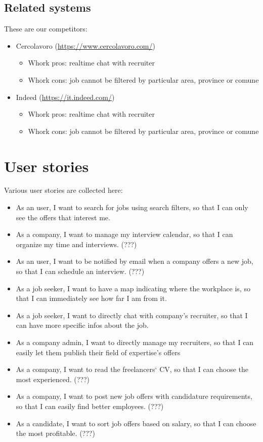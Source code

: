\documentclass[12pt, a4paper]{article}
\begin{document}
\subsection{Related systems}
These are our competitors:
\begin{itemize}
	\item Cercolavoro (\url{https://www.cercolavoro.com/})
	\begin{itemize}
		\item Whork pros: realtime chat with recruiter
		\item Whork cons: job cannot be filtered by particular area, province or comune
	\end{itemize}
	\item Indeed (\url{https://it.indeed.com/})
	\begin{itemize}
		\item Whork pros: realtime chat with recruiter
		\item Whork cons: job cannot be filtered by particular area, province or comune
	\end{itemize}
\end{itemize}

\section{User stories}
Various user stories are collected here:
\begin{itemize}
	\item As an user, I want to search for jobs using search filters,
		so that I can only see the offers that interest me.
	\item As a company, I want to manage my interview calendar, 
		so that I can organize my time and interviews. (???)
	\item As an user, I want to be notified by email when a company 
		offers a new job, so that I can schedule an interview. (???)
	\item As a job seeker, I want to have a map indicating where the workplace is,
		so that I can immediately see how far I am from it.
	\item As a job seeker, I want to directly chat with company's recruiter,
		so that I can have more specific infos about the job.
	\item As a company admin, I want to directly manage my recruiters,
		so that I can easily let them publish their field of expertise's offers
	\item As a company, I want to read the freelancers‘ CV, 
		so that I can choose the most experienced. (???)
	\item As a company, I want to post new job offers with candidature 
		requirements, so that I can easily find better employees. (???)
	\item As a candidate, I want to sort job offers based on salary, 
		so that I can choose the most profitable.  (???)
\end{itemize}
\end{document}
